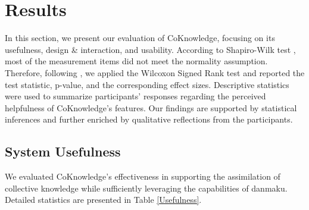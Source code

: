 \section{Results}

In this section, we present our evaluation of CoKnowledge, focusing on its usefulness, design \& interaction, and usability. 
According to Shapiro-Wilk test \cite{shapiro1965analysis}, most of the measurement items did not meet the normality assumption. 
Therefore, following \cite{sakai2017probability, sullivan2012using, tomczak2014need}, we applied the Wilcoxon Signed Rank test \cite{woolson2005wilcoxon} and reported the test statistic, p-value, and the corresponding effect sizes. Descriptive statistics were used to summarize participants' responses regarding the perceived helpfulness of CoKnowledge's features.
Our findings are supported by statistical inferences and further enriched by qualitative reflections from the participants.

\subsection{System Usefulness}
\label{sec:usefulness}
We evaluated CoKnowledge's effectiveness in supporting the assimilation of collective knowledge while sufficiently leveraging the capabilities of danmaku. Detailed statistics are presented in Table \ref{Usefulness}. 

